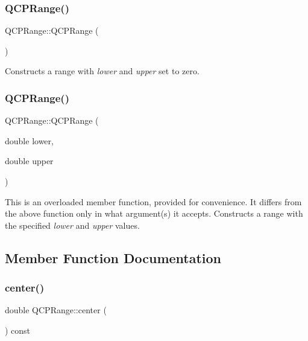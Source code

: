 \subsubsection{\texorpdfstring{Q\+C\+P\+Range()}{QCPRange()}\hspace{0.1cm}{\footnotesize\ttfamily [1/2]}}
{\footnotesize\ttfamily Q\+C\+P\+Range\+::\+Q\+C\+P\+Range (\begin{DoxyParamCaption}{ }\end{DoxyParamCaption})}

Constructs a range with {\itshape lower} and {\itshape upper} set to zero. \hypertarget{class_q_c_p_range_a1d9d84d084c8f368fdedd42e0978d405}{}\label{class_q_c_p_range_a1d9d84d084c8f368fdedd42e0978d405} 
\subsubsection{\texorpdfstring{Q\+C\+P\+Range()}{QCPRange()}\hspace{0.1cm}{\footnotesize\ttfamily [2/2]}}
{\footnotesize\ttfamily Q\+C\+P\+Range\+::\+Q\+C\+P\+Range (\begin{DoxyParamCaption}\item[{double}]{lower,  }\item[{double}]{upper }\end{DoxyParamCaption})}

This is an overloaded member function, provided for convenience. It differs from the above function only in what argument(s) it accepts. Constructs a range with the specified {\itshape lower} and {\itshape upper} values. 

\subsection{Member Function Documentation}
\hypertarget{class_q_c_p_range_af57d4a37a45d0101177ca30fae5d4ca8}{}\label{class_q_c_p_range_af57d4a37a45d0101177ca30fae5d4ca8} 
\subsubsection{\texorpdfstring{center()}{center()}}
{\footnotesize\ttfamily double Q\+C\+P\+Range\+::center (\begin{DoxyParamCaption}{ }\end{DoxyParamCaption}) const}

